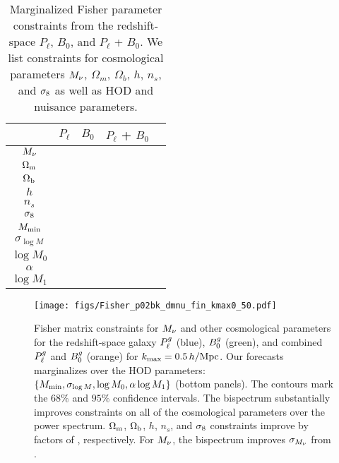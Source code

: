 \begin{table}
    \caption{Marginalized Fisher parameter constraints from the redshift-space 
    $P_\ell$, $B_0$, and $P_\ell$ + $B_0$. We list constraints for cosmological 
    parameters $M_\nu$, $\Omega_m$, $\Omega_b$, $h$, $n_s$, and $\sigma_8$ as well 
    as HOD and nuisance parameters.} 
\begin{center} 
    \begin{tabular}{ccccc} \toprule
            & $P_\ell$ & $B_0$ & $P_\ell$ + $B_0$ \\[3pt]
\hline 
$M_\nu$     & & & \\
$\Omega_{\rm m}$       & & & \\
$\Omega_{\rm b}$       & & & \\
$h$         & & & \\
$n_s$       & & & \\
$\sigma_8$      & & & \\\hline
$M_{\rm min}$       & & & \\
$\sigma_{\log M}$   & & & \\ 
$\log M_0$          & & & \\
$\alpha$            & & & \\ 
$\log M_1$          & & & \\ [3pt]
\hline            
\end{tabular} \label{tab:forecast}
\end{center}
\end{table}

\begin{figure}
    \begin{center}
        \texttt{[image: figs/Fisher\_p02bk\_dmnu\_fin\_kmax0\_50.pdf]}
        \caption{Fisher matrix constraints for $M_\nu$ and other cosmological
        parameters for the redshift-space galaxy $P^g_{\ell}$ (blue), $B^g_0$
        (green), and combined $P^g_{\ell}$ and $B^g_0$ (orange) for $k_{\rm max} =
        0.5\,h/\mathrm{Mpc}$. Our forecasts marginalizes over the \cite{zheng2007}
        HOD parameters: $\{M_{\rm min}, \sigma_{\log M}, \log M_0, \alpha \log
        M_1 \}$ (bottom panels). The contours mark the $68\%$ and $95\%$
        confidence intervals. The bispectrum substantially improves
        constraints on all of the cosmological parameters over the power
        spectrum. $\Omega_{\rm m}$, $\Omega_{\rm b}$, $h$, $n_s$, and $\sigma_8$ constraints improve by factors
        of , respectively. For $M_\nu$, the
        bispectrum improves $\sigma_{M_\nu}$ from .
        }
        \label{fig:forecast}
    \end{center}
\end{figure}

